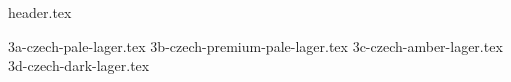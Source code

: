 \clearpage
{}
\divisorLine
{header.tex}
\begin{multicols*}{2}
{3a-czech-pale-lager.tex}
{3b-czech-premium-pale-lager.tex}
{3c-czech-amber-lager.tex}
{3d-czech-dark-lager.tex}
\end{multicols*}